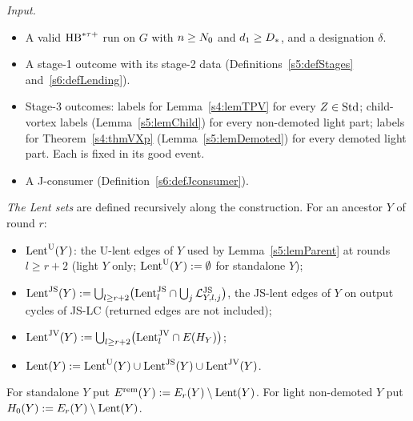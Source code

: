 \begin{construction}\label{s6:consOrder}
\emph{Input.}
\begin{itemize}
\item A valid $\mathrm{HB}^{*\tau{+}}$ run on $G$ with $n\ge N_{0}$ and $d_1\ge D_{*}$, and a designation $\delta$.
\item A stage-1 outcome with its stage-2 data (Definitions~\ref{s5:defStages} and~\ref{s6:defLending}).
\item Stage-3 outcomes: labels for Lemma~\ref{s4:lemTPV} for every $Z\in\mathrm{Std}$; child-vortex labels (Lemma~\ref{s5:lemChild}) for every non-demoted light part; labels for Theorem~\ref{s4:thmVXp} (Lemma~\ref{s5:lemDemoted}) for every demoted light part. Each is fixed in its good event.
\item A J-consumer (Definition~\ref{s6:defJconsumer}).
\end{itemize}

\emph{The Lent sets} are defined recursively along the construction. For an ancestor $Y$ of round $r$:
\begin{itemize}
\item $\mathrm{Lent}^{\mathrm{U}}(Y)$: the U-lent edges of $Y$ used by Lemma~\ref{s5:lemParent} at rounds $l\ge r+2$ (light $Y$ only; $\mathrm{Lent}^{\mathrm{U}}(Y):=\emptyset$ for standalone $Y$);
\item $\mathrm{Lent}^{\mathrm{JS}}(Y):=\bigcup_{l\ge r+2}\bigl(\mathrm{Lent}^{\mathrm{JS}}_l\cap\bigcup_j\mathcal{L}^{\mathrm{JS}}_{Y,l,j}\bigr)$, the JS-lent edges of $Y$ on output cycles of JS-LC (returned edges are not included);
\item $\mathrm{Lent}^{\mathrm{JV}}(Y):=\bigcup_{l\ge r+2}\bigl(\mathrm{Lent}^{\mathrm{JV}}_l\cap E(H_Y)\bigr)$;
\item $\mathrm{Lent}(Y):=\mathrm{Lent}^{\mathrm{U}}(Y)\cup\mathrm{Lent}^{\mathrm{JS}}(Y)\cup\mathrm{Lent}^{\mathrm{JV}}(Y)$.
\end{itemize}
For standalone $Y$ put $E^{\mathrm{rem}}(Y):=E_r(Y)\setminus\mathrm{Lent}(Y)$. For light non-demoted $Y$ put $H_0(Y):=E_r(Y)\setminus\mathrm{Lent}(Y)$.


\end{construction}
